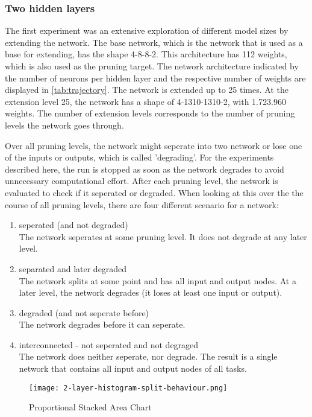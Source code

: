 \subsubsection{Two hidden layers}
The first experiment was an extensive exploration of different model sizes by extending the network.
The base network, which is the network that is used as a base for extending, has the shape 4-8-8-2.
This architecture has 112 weights, which is also used as the pruning target.
The network architecture indicated by the number of neurons per hidden layer and the respective number of weights are displayed in \ref{tab:trajectory}.
The network is extended up to 25 times.
At the extension level 25, the network has a shape of 4-1310-1310-2, with 1.723.960 weights.
The number of extension levels corresponds to the number of pruning levels the network goes through.

Over all pruning levels, the network might seperate into two network or lose one of the inputs or outputs, which is called 'degrading'.
For the experiments described here, the run is stopped as soon as the network degrades to avoid unnecessary computational effort.
After each pruning level, the network is evaluated to check if it seperated or degraded.
When looking at this over the the course of all pruning levels, there are four different scenario for a network:

\begin{enumerate}
    \item seperated (and not degraded)\\
    The network seperates at some pruning level. 
    It does not degrade at any later level. 
    \item separated and later degraded \\
    The network splits at some point and has all input and output nodes.
    At a later level, the network degrades (it loses at least one input or output).
    \item degraded (and not seperate before) \\
    The network degrades before it can seperate.
    \item interconnected - not seperated and not degraged \\
    The network does neither seperate, nor degrade. 
    The result is a single network that contains all input and output nodes of all tasks.
\end{enumerate}

\begin{figure}[ht]
    \centering
    \texttt{[image: 2-layer-histogram-split-behaviour.png]}
    \caption{Proportional Stacked Area Chart}
    \label{fig:2laxer-histogram}
\end{figure}

